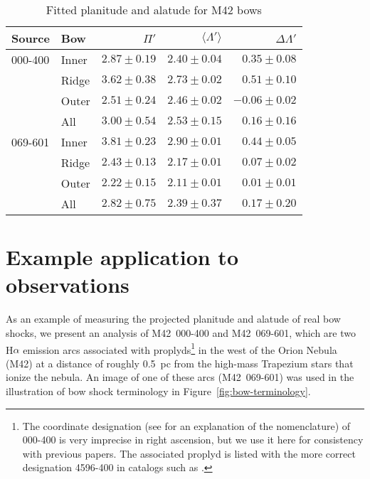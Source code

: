 \documentclass[useAMS, usenatbib, a4paper]{mnras}
\begin{document}
\begin{table}
  \caption[]{Fitted planitude and alatude for M42 bows}
  \label{tab:m42-fit}
  \centering
  \begin{tabular}{ll rrr}
    \toprule
    Source & Bow & \(\Pi'\) & \(\langle \Lambda' \rangle\)& \(\Delta\Lambda'\) \\
    \midrule
    000-400 & Inner & \(2.87 \pm 0.19\) & \(2.40 \pm 0.04\) & \(0.35 \pm 0.08\) \\
           &  Ridge & \(3.62 \pm 0.38\) & \(2.73 \pm 0.02\) & \(0.51 \pm 0.10\) \\
           & Outer & \(2.51 \pm 0.24\) & \(2.46 \pm 0.02\) & \(-0.06 \pm 0.02\) \\[\smallskipamount]
           & All & \(3.00 \pm 0.54\) & \(2.53 \pm 0.15\) & \(0.16 \pm 0.16\) \\[\bigskipamount]
    069-601 & Inner & \(3.81 \pm 0.23\) & \(2.90 \pm 0.01\) & \(0.44 \pm 0.05\) \\
           & Ridge & \(2.43 \pm 0.13\) & \(2.17 \pm 0.01\) & \(0.07 \pm 0.02\) \\
           & Outer & \(2.22 \pm 0.15\) & \(2.11 \pm 0.01\) & \(0.01 \pm 0.01\) \\[\smallskipamount]
           & All & \(2.82 \pm 0.75\) & \(2.39 \pm 0.37\) & \(0.17 \pm 0.20\)\\
    \bottomrule
  \end{tabular}
\end{table}

\section{Example application to observations}
\label{sec:obs}

As an example of measuring the projected planitude and alatude of real
bow shocks, we present an analysis of M42~000-400 and M42~069-601,
which are two H\(\alpha\) emission arcs \citep{Bally:2000a,
  Gutierrez-Soto:2015a} associated with proplyds\footnote{%
  The coordinate designation (see \citealp{ODell:1994a} for an
  explanation of the nomenclature) of 000-400 is very imprecise in
  right ascension, but we use it here for consistency with previous
  papers. The associated proplyd is listed with the more correct
  designation 4596-400 in catalogs such as \citet{Ricci:2008a}.  } %
in the west of the Orion Nebula (M42) at a distance of roughly
\SI{0.5}{pc} from the high-mass Trapezium stars that ionize the
nebula.  An image of one of these arcs (M42~069-601) was used in the
illustration of bow shock terminology in
Figure~\ref{fig:bow-terminology}.
\end{document}
